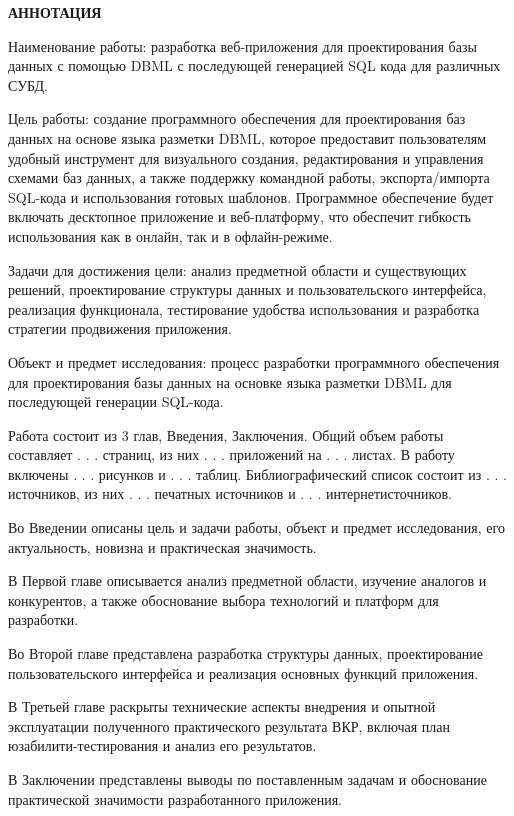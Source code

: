 \newpage
\begin{center}
  \textbf{\large АННОТАЦИЯ}
\end{center}

Наименование работы: разработка веб-приложения для проектирования базы
данных с помощью DBML с последующей генерацией
SQL кода для различных СУБД.

Цель работы: создание программного обеспечения для проектирования баз данных на основе языка разметки DBML, которое предоставит пользователям удобный инструмент для визуального создания, редактирования и управления схемами баз данных, а также поддержку командной работы, экспорта/импорта SQL-кода и использования готовых шаблонов. Программное обеспечение будет включать десктопное приложение и веб-платформу, что обеспечит гибкость использования как в онлайн, так и в офлайн-режиме.

Задачи для достижения цели: анализ предметной области и существующих решений, проектирование структуры данных и пользовательского интерфейса, реализация функционала, тестирование удобства использования и
разработка стратегии продвижения приложения.

Объект и предмет исследования: процесс разработки программного обеспечения для проектирования базы данных на основке языка разметки DBML для последующей генерации SQL-кода.

Работа состоит из 3 глав, Введения, Заключения. Общий
объем работы составляет . . . страниц, из них . . . приложений на . . . листах.
В работу включены . . . рисунков и . . . таблиц. Библиографический список
состоит из . . . источников, из них . . . печатных источников и . . . интернетисточников.

Во Введении описаны цель и задачи работы, объект и предмет исследования, его актуальность, новизна и практическая значимость.

В Первой главе описывается анализ предметной области, изучение аналогов и конкурентов, а также обоснование выбора технологий и платформ
для разработки.

Во Второй главе представлена разработка структуры данных, проектирование пользовательского интерфейса и реализация основных функций приложения.

В Третьей главе раскрыты технические аспекты внедрения и опытной
эксплуатации полученного практического результата ВКР, включая план юзабилити-тестирования и анализ его результатов.

В Заключении представлены выводы по поставленным задачам и обоснование практической значимости разработанного приложения.

